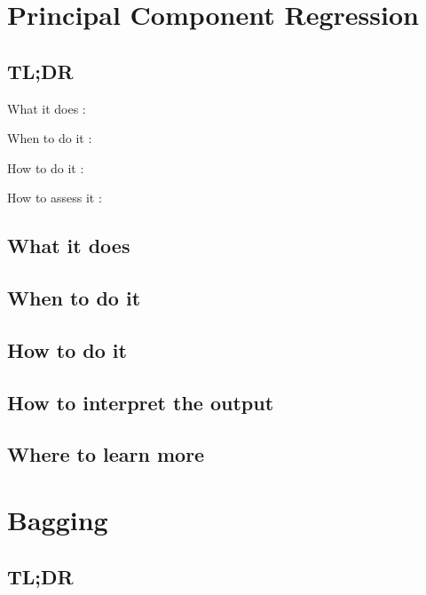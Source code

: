 \documentclass[
]{book}
\begin{document}
\hypertarget{principal-component-regression}{%
\chapter{Principal Component Regression}\label{principal-component-regression}}

\hypertarget{tldr-15}{%
\section{TL;DR}\label{tldr-15}}

What it does
:

When to do it
:

How to do it
:

How to assess it
:

\hypertarget{what-it-does-15}{%
\section{What it does}\label{what-it-does-15}}

\hypertarget{when-to-do-it-15}{%
\section{When to do it}\label{when-to-do-it-15}}

\hypertarget{how-to-do-it-15}{%
\section{How to do it}\label{how-to-do-it-15}}

\hypertarget{how-to-interpret-the-output-15}{%
\section{How to interpret the output}\label{how-to-interpret-the-output-15}}

\hypertarget{where-to-learn-more-15}{%
\section{Where to learn more}\label{where-to-learn-more-15}}

\hypertarget{bagging}{%
\chapter{Bagging}\label{bagging}}

\hypertarget{tldr-16}{%
\section{TL;DR}\label{tldr-16}}
\end{document}
